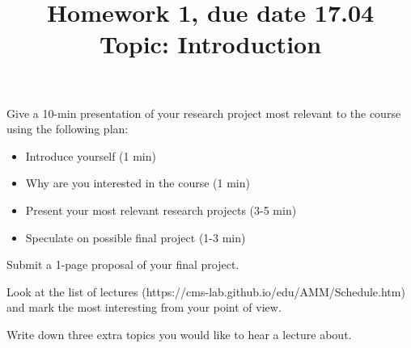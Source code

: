 \documentclass{homework}
\begin{document}
\title{Homework 1, due date 17.04 \\ Topic: Introduction}
\maketitle

\begin{task} Give a 10-min presentation of your research project most relevant to the course using the following plan:
\begin{itemize}\setlength{\itemsep}{0ex}
\item Introduce yourself (1 min)
\item Why are you interested in the course (1 min)
\item Present your most relevant research projects (3-5 min)
\item Speculate on possible final project (1-3 min)
\end{itemize}
\end{task}

\begin{task} Submit a 1-page proposal of your final project.
\end{task}

\begin{task}
Look at the list of lectures (https://cms-lab.github.io/edu/AMM/Schedule.htm) and mark the most interesting from your point of view. 
\end{task}

\begin{task}
Write down three extra topics you would like to hear a lecture about.
\end{task}
\end{document}
